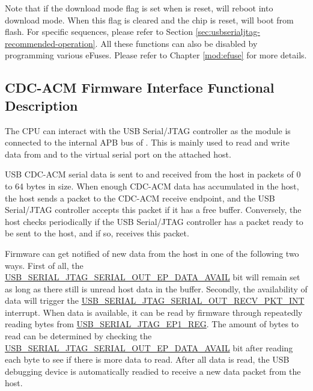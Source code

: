 \documentclass[main\_\_EN.tex]{subfiles}
\begin{document}
Note that if the download mode flag is set when \chipname{} is reset, \chipname{} will reboot into download mode. When this flag is cleared and the chip is reset, \chipname{} will boot from flash. For specific sequences, please refer to Section \ref{sec:usbserialjtag-recommended-operation}. All these functions can also be disabled by programming various eFuses. Please refer to Chapter \ref{mod:efuse} \textit{} for more details.

\subsection{CDC-ACM Firmware Interface Functional Description}

The CPU can interact with the USB Serial/JTAG controller as the module is connected to the internal APB bus of \chipname{}. This is mainly used to read and write data from and to the virtual serial port on the attached host.

USB CDC-ACM serial data is sent to and received from the host in packets of 0 to 64 bytes in size. When enough CDC-ACM data has accumulated in the host, the host sends a packet to the CDC-ACM receive endpoint, and the USB Serial/JTAG controller accepts this packet if it has a free buffer. Conversely, the host checks periodically if the USB Serial/JTAG controller has a packet ready to be sent to the host, and if so, receives this packet.

Firmware can get notified of new data from the host in one of the following two ways. First of all, the\\
\hyperref[fielddesc:USBSERIALJTAGSERIALOUTEPDATAAVAIL]{USB\_SERIAL\_JTAG\_SERIAL\_OUT\_EP\_DATA\_AVAIL}  bit  will remain set as long as there still is unread host data in the buffer. Secondly, the availability of data will trigger the  \hyperref[fielddesc:USBSERIALJTAGSERIALOUTRECVPKTINTRAW]{USB\_SERIAL\_JTAG\_SERIAL\_OUT\_RECV\_PKT\_INT} interrupt. When data is available, it can be read by firmware through repeatedly reading bytes from \hyperref[fielddesc:USBSERIALJTAGRDWRBYTE]{USB\_SERIAL\_JTAG\_EP1\_REG}. The amount of bytes to read can be determined by checking the
\hyperref[fielddesc:USBSERIALJTAGSERIALOUTEPDATAAVAIL]{USB\_SERIAL\_JTAG\_SERIAL\_OUT\_EP\_DATA\_AVAIL} bit after reading each byte to see if there is more data to read. After all data is read, the USB debugging device is automatically readied to receive a new data packet from the host. 
\end{document}
